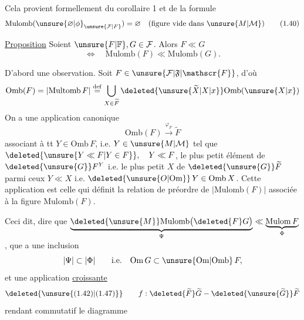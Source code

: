 Cela provient formellement du corollaire 1 et de la formule
\[
 \mathrm{Mulomb}(\unsure{\varnothing|\phi}_{\unsure{\mathcal{F}|F}})=\varnothing\quad(\text{figure vide dans }\unsure{M|\mathcal M})
 \tag*{(1.40)}
\]

\uline{Proposition} Soient $\unsure{F|\mathbb{F}},G\in\mathcal{F}$. Alors $F\ll G$
\[
 \Longleftrightarrow\quad\mathrm{Mulomb}(F)\ll\mathrm{Mulomb}(G).
\]

D'abord une observation. Soit $F\in\unsure{\mathcal{F}|\mathfrak{F}|\mathscr{F}}$, d'où
\[
\mathrm{Omb}(F)=\lvert\mathrm{Multomb}\,F\rvert
 \overset{\mathrm{def}}{=}
 \bigcup_{X\in\widetilde F}\deleted{\unsure{\widetilde X|X|x}}\mathrm{Omb}(\unsure{X|x})
\]
On a une application canonique
\[
\mathrm{Omb}(F)\xrightarrow{\varphi_F}\widetilde F
\]
associant à tt $Y\in\mathrm{Omb}\,F$, i.e. $Y\in\unsure{M|\mathcal{M}}$ tel que
$\deleted{\unsure{Y\ll F|Y\in F}},\quad Y\ll F$, le plus petit élément de $\deleted{\unsure{G}}F^{Y}$
i.e. le plus petit $X$ de $\deleted{\unsure{G}}\widetilde F$ parmi ceux 
$Y\ll X$ i.e. $\deleted{\unsure{O|\mathrm{Om}}}\,Y\in\mathrm{Omb}\,X$. Cette application est celle qui définit la relation de préordre de $\lvert\mathrm{Mulomb}(F)\rvert$ associée à la figure $\mathrm{Mulomb}(F)$.

Ceci dit,  dire que
$\underbrace{\deleted{\unsure{M}}\mathrm{Mulomb}\bigl(\deleted{F}G\bigr)}_{\Psi}\ll\underbrace{\mathrm{Mulom}\,F}_{\Phi}$,
 que  a une inclusion
\[
 \lvert\Psi\rvert\subset\lvert\Phi\rvert\qquad\text{i.e.}\quad \mathrm{Om}\,G\subset\unsure{\mathrm{Om}|\mathrm{Omb}}\,F,
\]
et une application \uline{croissante}
\[
\deleted{\unsure{\text{(1.42)}|\text{(1.47)}}}\qquad
f:\deleted{\widetilde F}\widetilde G\mathbin{-}\deleted{\unsure{\widetilde G}}\widetilde F
\]
rendant commutatif le diagramme


